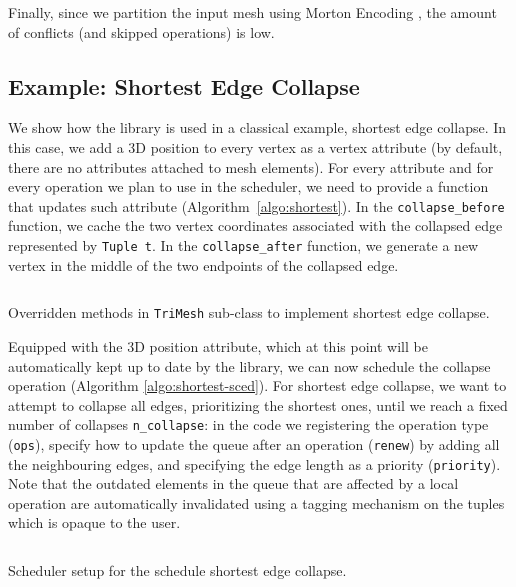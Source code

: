 Finally, since we partition the input mesh using {Morton Encoding} \cite{karras2012maximizing}, the amount of conflicts (and skipped operations) is low.



\subsection{{Example: Shortest Edge Collapse}}

We show how the library is used in a classical example, shortest edge collapse. In this case, we add a 3D position to every vertex as a vertex attribute (by default, there are no attributes attached to mesh elements). For every attribute and for every operation we plan to use in the scheduler, we need to provide a function that updates such attribute (Algorithm~\ref{algo:shortest}). In the \texttt{collapse\_before} function, we cache the two vertex coordinates associated with the collapsed edge represented by \texttt{Tuple t}. In the \texttt{collapse\_after} function, we generate a new vertex in the middle of the two endpoints of the collapsed edge. %

\begin{longlisting}
\inputminted{cpp}{wmtk-tex/code/shortest.cpp}
\caption{Overridden methods in \texttt{TriMesh} sub-class to implement shortest edge collapse.}
\label{algo:shortest}
\end{longlisting}

Equipped with the 3D position attribute, which at this point will be automatically kept up to date by the library, we can now schedule the collapse operation (Algorithm \ref{algo:shortest-sced}). For shortest edge collapse, we want to attempt to collapse all edges, prioritizing the shortest ones, until we reach a fixed number of collapses \texttt{n\_collapse}: in the code we registering the operation type (\texttt{ops}), specify how to update the queue after an operation (\texttt{renew}) by adding all the neighbouring edges, and specifying the edge length as a priority (\texttt{priority}). Note that the {outdated} elements in the queue that are affected by a local operation are automatically invalidated using a tagging mechanism on the tuples which is opaque to the user.

\begin{longlisting}
\inputminted{cpp}{wmtk-tex/code/shortest-sched.cpp}
\caption{Scheduler setup for the schedule shortest edge collapse.}
\label{algo:shortest-sced}
\end{longlisting}